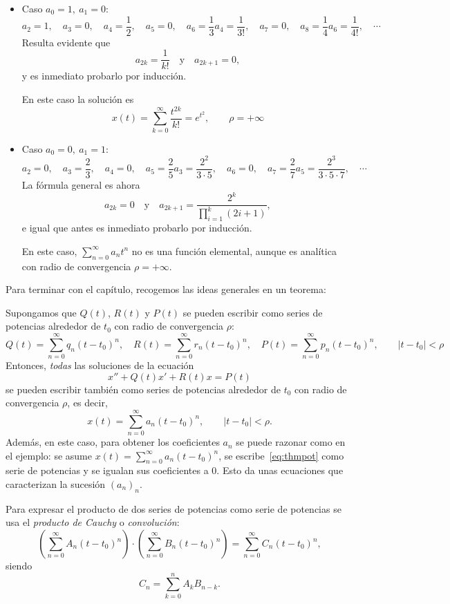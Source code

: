 \documentclass[../ecuaciones_diferenciales.tex]{subfiles}
\begin{document}
\begin{solution}
	\begin{itemize}
		\item Caso \(a_0 = 1,\ a_1 = 0\):
		      \[a_2 = 1, \quad a_3 = 0, \quad a_4 = \frac{1}{2}, \quad a_5 = 0, \quad a_6 =
			      \frac{1}{3}a_4 = \frac{1}{3!}, \quad a_7 = 0, \quad a_8 = \frac{1}{4}a_6 =
			      \frac{1}{4!}, \quad \cdots\]
		      Resulta evidente que
		      \[a_{2k} = \frac{1}{k!} \quad \text{y} \quad a_{2k+1} = 0,\]
		      y es inmediato probarlo por inducción.

		      En este caso la solución es
		      \[x(t) = \sum_{k=0}^\infty \frac{t^{2k}}{k!} = e^{t^2}, \qquad \rho =
			      +\infty\]

		\item Caso \(a_0 = 0,\ a_1 = 1\):
		      \[a_2 = 0, \quad a_3 = \frac{2}{3}, \quad a_4 = 0, \quad a_5 = \frac{2}{5}a_3
			      = \frac{2^2}{3 \cdot 5}, \quad a_6 = 0, \quad a_7 = \frac{2}{7}a_5 =
			      \frac{2^3}{3 \cdot 5 \cdot 7}, \quad \cdots\]
		      La fórmula general es ahora
		      \[a_{2k} = 0 \quad \text{y} \quad a_{2k+1} = \frac{2^k}{\prod_{i=1}^k
				      (2i+1)},\]
		      e igual que antes es inmediato probarlo por inducción.

		      En este caso, \(\sum_{n=0}^\infty a_n t^n\) no es una función
		      elemental, aunque es analítica con radio de
		      convergencia \(\rho = +\infty\).
	\end{itemize}
\end{solution}

Para terminar con el capítulo, recogemos las ideas generales en un teorema:
\begin{theorem}
	Supongamos que \(Q(t)\), \(R(t)\) y \(P(t)\) se pueden escribir como series
	de potencias alrededor de \(t_0\) con radio de convergencia \(\rho\):
	\[Q(t) = \sum_{n=0}^\infty q_n {(t-t_0)}^n, \quad R(t) = \sum_{n=0}^\infty
		r_n {(t-t_0)}^n, \quad P(t) = \sum_{n=0}^\infty p_n {(t-t_0)}^n,
		\qquad |t-t_0| < \rho\]
	Entonces, \emph{todas} las soluciones de la ecuación
	\begin{equation} \label{eq:thmpot}
		x'' + Q(t)x' + R(t)x = P(t)
	\end{equation}
	se pueden escribir también como series de potencias alrededor de
	\(t_0\) con radio de convergencia \(\rho\), es decir,
	\[x(t) = \sum_{n=0}^\infty a_n {(t-t_0)}^n, \qquad |t-t_0| < \rho.\]
	Además, en este caso, para obtener los coeficientes \(a_n\) se puede razonar
	como en el ejemplo: se asume \(x(t) = \sum_{n=0}^\infty a_n {(t-t_0)}^n\), se
	escribe~\eqref{eq:thmpot} como serie de potencias y se igualan sus
	coeficientes a 0. Esto da unas ecuaciones que caracterizan la sucesión
	\({(a_n)}_n\).
\end{theorem}

\begin{remark}
	Para expresar el producto de dos series de potencias como serie de potencias
	se usa el \emph{producto de Cauchy} o \emph{convolución}:
	\[\left( \sum_{n=0}^\infty A_n {(t-t_0)}^n \right) \cdot
		\left( \sum_{n=0}^\infty B_n {(t-t_0)}^n \right) =
		\sum_{n=0}^\infty C_n {(t-t_0)}^n,\]
	siendo
	\[C_n = \sum_{k=0}^n A_k B_{n-k}.\]
\end{remark}
\end{document}
